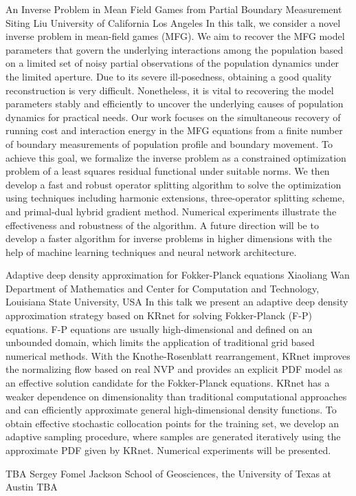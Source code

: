 \begin{addmargin}[2em]{0em}
\vspace{1.5ex}
\abs
{An Inverse Problem in Mean Field Games from Partial Boundary Measurement}
{Siting Liu}
{University of California Los Angeles}
{In this talk, we consider a novel inverse problem in mean-field games (MFG). We aim to recover the MFG model parameters that govern the underlying interactions among the population based on a limited set of noisy partial observations of the population dynamics under the limited aperture. Due to its severe ill-posedness, obtaining a good quality reconstruction is very difficult. Nonetheless, it is vital to recovering the model parameters stably and efficiently to uncover the underlying causes of population dynamics for practical needs.
	Our work focuses on the simultaneous recovery of running cost and interaction energy in the MFG equations from a finite number of boundary measurements of population profile and boundary movement. To achieve this goal, we formalize the inverse problem as a constrained optimization problem of a least squares residual functional under suitable norms. We then develop a fast and robust operator splitting algorithm to solve the optimization using techniques including harmonic extensions, three-operator splitting scheme, and primal-dual hybrid gradient method. Numerical experiments illustrate the effectiveness and robustness of the algorithm.
	A future direction will be to develop a faster algorithm for inverse problems in higher dimensions with the help of machine learning techniques and neural network architecture.}


\vspace{1.5ex}
\abs
{Adaptive deep density approximation for Fokker-Planck equations}
{Xiaoliang Wan}
{Department of Mathematics and Center for Computation and Technology, Louisiana State University, USA}
{In this talk we present an adaptive deep density approximation strategy based on KRnet for solving Fokker-Planck (F-P) equations. F-P equations are usually high-dimensional and defined on an unbounded domain, which limits the application of traditional grid based numerical methods. With the Knothe-Rosenblatt rearrangement, KRnet improves the normalizing flow based on real NVP and provides an explicit PDF model as an effective solution candidate for the Fokker-Planck equations. KRnet has a weaker dependence on dimensionality than traditional computational approaches and can efficiently approximate general high-dimensional density functions. To obtain effective stochastic collocation points for the training set, we develop an adaptive sampling procedure, where samples are generated iteratively using the approximate PDF given by KRnet. Numerical experiments will be presented.}


\vspace{1.5ex}
\abs
{TBA}
{Sergey Fomel}
{Jackson School of Geosciences, the University of Texas at Austin}
{TBA}
\end{addmargin}
